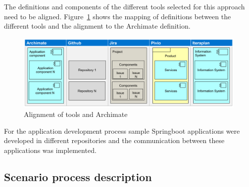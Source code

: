 The definitions and components of the different tools selected for this approach need to be aligned. Figure~\ref{fig:tools-mapping} shows the mapping of definitions between the different tools and the alignment to the Archimate definition.

\begin{figure}[htpb]
  \centering
  \includegraphics[width=1.0\textwidth]{figures/tools-mapping.PNG}
  \caption{Alignment of tools and Archimate}
  \label{fig:tools-mapping}
\end{figure}

For the application development process sample Springboot applications were developed in different repositories and the communication between these applications was implemented.


\subsection{Scenario process description}\label{subsection:scenarioprocessdescription}

